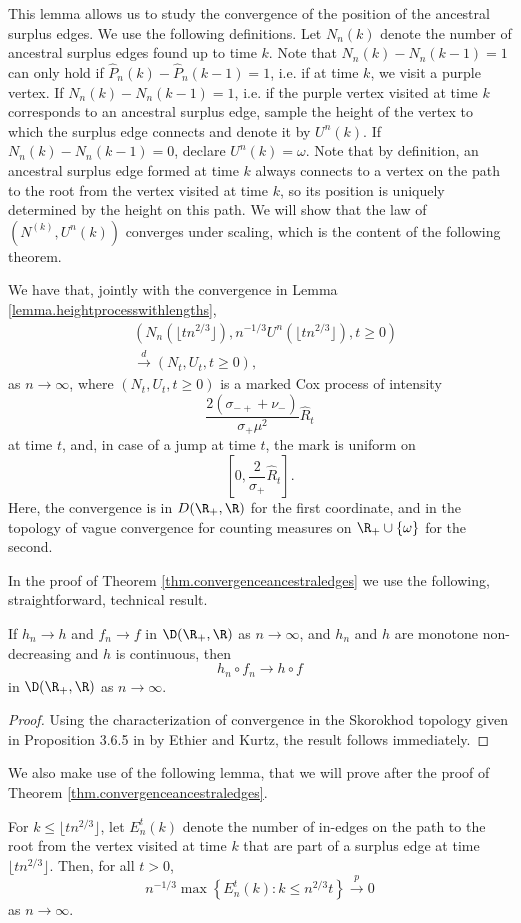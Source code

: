This lemma allows us to study the convergence of the position of the ancestral surplus edges. We use the following definitions. Let $N_n(k)$ denote the number of ancestral surplus edges found up to time $k$. Note that $N_n(k)-N_n(k-1)=1$ can only hold if $\hat{P}_n(k)-\hat{P}_n(k-1)=1$, i.e. if at time $k$, we visit a purple vertex. If $N_n(k)-N_n(k-1)=1$, i.e. if the purple vertex visited at time $k$ corresponds to an ancestral surplus edge, sample  the height of the vertex to which the surplus edge connects and denote it by $U^n(k)$. If $N_n(k)-N_n(k-1)=0$, declare $U^n(k)=\omega$. Note that by definition, an ancestral surplus edge formed at time $k$ always connects to a vertex on the path to the root from the vertex visited at time $k$, so its position is uniquely determined by the height on this path. We will show that the law of $(N^(k),U^n(k))$ converges under scaling, which is the content of the following theorem. 

\begin{theorem}\label{thm.convergenceancestraledges}
We have that, jointly with the convergence in Lemma \ref{lemma.heightprocesswithlengths},
\begin{align*}&\left(N_n\left(\lfloor tn^{2/3}\rfloor\right), n^{-1/3}U^n\left(\lfloor tn^{2/3}\rfloor\right),t\geq 0\right)\\
&\overset{d}{\to}\left(N_t,U_t,t\geq 0\right),\end{align*}
as $n\to \infty$, where $(N_t,U_t,t\geq 0)$ is a marked Cox process of intensity $$\frac{2(\sigma_{-+}+\nu_-)}{\sigma_+\mu^2} \hat{R}_t$$ at time $t$, and, in case of a jump at time $t$, the mark is uniform on $$[0,\frac{2}{\sigma_+} \hat{R}_t].$$ 
Here, the convergence is in $D(\R_+,\R)$ for the first coordinate, and in the topology of vague convergence for counting measures on $\R_+\cup \{\omega\}$ for the second. 
\end{theorem}
In the proof of Theorem \ref{thm.convergenceancestraledges} we use the following, straightforward, technical result.
\begin{lemma}\label{lemma.technicalcomposedfunctions}
If $h_n\to h$ and $f_n\to f$ in $\D(\R_+,\R)$ as $n\to\infty$, and $h_n$ and $h$ are monotone non-decreasing and $h$ is continuous, then 
$$h_n\circ f_n \to h\circ f$$
in $\D(\R_+,\R)$ as $n\to\infty$.
\end{lemma}
\begin{proof}
Using the characterization of convergence in the Skorokhod topology given in Proposition 3.6.5 in \cite{Ethier1986} by Ethier and Kurtz, the result follows immediately.
\end{proof}
We also make use of the following lemma, that we will prove after the proof of Theorem \ref{thm.convergenceancestraledges}. 
\begin{lemma}\label{lemma.usedancestralonpathtoroot}
For $k\leq \lfloor tn^{2/3}\rfloor$, let $E^t_n(k)$ denote the number of in-edges on the path to the root from the vertex visited at time $k$ that are part of a surplus edge at time $\lfloor tn^{2/3}\rfloor$. Then, for all $t>0$,
$$n^{-1/3}\max\left\{E^t_n(k):k\leq n^{2/3}t\right\}\overset{p}{\to}0$$
as $n\to \infty$.
\end{lemma}


